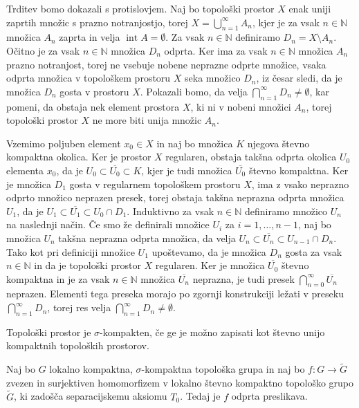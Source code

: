 \documentclass[mat1]{fmfdelo}
\newcommand{\N}{\mathbb N}
\newcommand{\closure}[1]{\overline{#1}}
\DeclareMathOperator{\interior}{int}
\begin{document}
\begin{dokaz}
Trditev bomo dokazali s protislovjem. Naj bo topološki prostor $X$ enak uniji zaprtih množic s prazno notranjostjo, torej $X = \bigcup_{n=1}^\infty A_n$, kjer je za vsak $n \in \N$ množica $A_n$ zaprta in velja $\interior{A} = \emptyset$. Za vsak $n \in \N$ definiramo $D_n = X \setminus A_n$. Očitno je za vsak $n \in \N$ množica $D_n$ odprta. Ker ima za vsak $n \in \N$ množica $A_n$ prazno notranjost, torej ne vsebuje nobene neprazne odprte množice, vsaka odprta množica v topološkem prostoru $X$ seka množico $D_n$, iz česar sledi, da je množica $D_n$ gosta v prostoru $X$. Pokazali bomo, da velja $\bigcap_{n=1}^\infty D_n \neq \emptyset$, kar pomeni, da obstaja nek element prostora $X$, ki ni v nobeni množici $A_n$, torej topološki prostor $X$ ne more biti unija množic $A_n$.

Vzemimo poljuben element $x_0 \in X$ in naj bo množica $K$ njegova števno kompaktna okolica. Ker je prostor $X$ regularen, obstaja takšna odprta okolica $U_0$ elementa $x_0$, da je $U_0 \subset \closure{U_0} \subset K$, kjer je tudi množica $\closure{U_0}$ števno kompaktna. Ker je množica $D_1$ gosta v regularnem topološkem prostoru $X$, ima z vsako neprazno odprto množico neprazen presek, torej obstaja takšna neprazna odprta množica $U_1$, da je $U_1 \subset \closure{U_1} \subset U_0 \cap D_1$. Induktivno za vsak $n \in \N$ definiramo množico $U_n$ na naslednji način. Če smo že definirali množice $U_i$ za $i = 1,\dots,n-1$, naj bo množica $U_n$ takšna neprazna odprta množica, da velja $U_n \subset \closure{U_n} \subset U_{n-1} \cap D_n$. Tako kot pri definiciji množice $U_1$ upoštevamo, da je množica $D_n$ gosta za vsak $n \in \N$ in da je topološki prostor $X$ regularen.
Ker je množica $\closure{U_0}$ števno kompaktna in je za vsak $n \in \N$ množica $\closure{U_n}$ neprazna, je tudi presek $\bigcap_{n=0}^\infty \closure{U_n}$ neprazen. Elementi tega preseka morajo po zgornji konstrukciji ležati v preseku $\bigcap_{n=1}^\infty D_n$, torej res velja $\bigcap_{n=1}^\infty D_n \neq \emptyset$.
\end{dokaz}

\begin{definicija}
Topološki prostor je $\sigma$-kompakten, če ge je možno zapisati kot števno unijo kompaktnih topoloških prostorov.
\end{definicija}

\begin{trditev}\label{trd:kompodp}
Naj bo $G$ lokalno kompaktna, $\sigma$-kompaktna topološka grupa in naj bo $f\colon G \to \widetilde{G}$ zvezen in surjektiven homomorfizem v lokalno števno kompaktno topološko grupo $\widetilde{G}$, ki zadošča separacijskemu aksiomu $T_0$. Tedaj je $f$ odprta preslikava.
\end{trditev}
\end{document}
